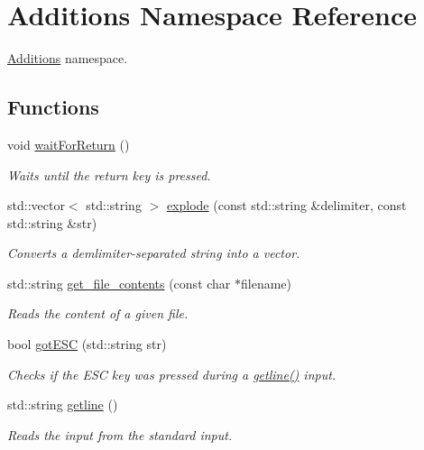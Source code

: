 \hypertarget{namespace_additions}{\section{Additions Namespace Reference}
\label{namespace_additions}
}


\hyperlink{namespace_additions}{Additions} namespace.  


\subsection*{Functions}
\begin{DoxyCompactItemize}
\item 
void \hyperlink{namespace_additions_a05946b8c576a8237b5b447f70e55a79d}{wait\-For\-Return} ()
\begin{DoxyCompactList}\small\item\em Waits until the return key is pressed. \end{DoxyCompactList}\item 
std\-::vector$<$ std\-::string $>$ \hyperlink{namespace_additions_a1abf6964ffd9abf97c743c514c2f401a}{explode} (const std\-::string \&delimiter, const std\-::string \&str)
\begin{DoxyCompactList}\small\item\em Converts a demlimiter-\/separated string into a vector. \end{DoxyCompactList}\item 
std\-::string \hyperlink{namespace_additions_aa81067806f9cd7e83231a302d0e4ab08}{get\-\_\-file\-\_\-contents} (const char $\ast$filename)
\begin{DoxyCompactList}\small\item\em Reads the content of a given file. \end{DoxyCompactList}\item 
bool \hyperlink{namespace_additions_a5dfbe44598a91e2e617b6afc56dbf6fa}{got\-E\-S\-C} (std\-::string str)
\begin{DoxyCompactList}\small\item\em Checks if the E\-S\-C key was pressed during a \hyperlink{namespace_additions_a9adf5327d4aa6631c5395cd58ab88237}{getline()} input. \end{DoxyCompactList}\item 
std\-::string \hyperlink{namespace_additions_a9adf5327d4aa6631c5395cd58ab88237}{getline} ()
\begin{DoxyCompactList}\small\item\em Reads the input from the standard input. \end{DoxyCompactList}\item 

\end{DoxyCompactItemize}
